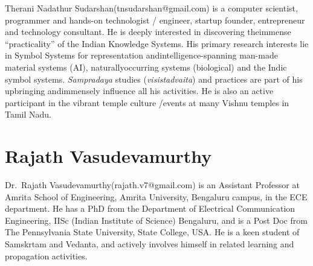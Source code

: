 Therani Nadathur Sudarshan(tnsudarshan@gmail.com) is a computer scientist, programmer and hands-on technologist / engineer, startup founder, entrepreneur and technology consultant. He is deeply interested in discovering the\break immense “practicality” of the Indian Knowledge Systems. His primary research interests lie in Symbol Systems for representation and\break intelligence-spanning man-made material systems (AI), naturally\break occurring systems (biological) and the Indic symbol systems. {\sl Sampradaya} studies ({\sl visistadvaita}) and practices are part of his upbringing and\break immensely influence all his activities. He is also an active participant in the vibrant temple culture /events at many Vishnu temples in Tamil Nadu.

\section*{Rajath Vasudevamurthy}

Dr.~Rajath Vasudevamurthy(rajath.v7@gmail.com) is an Assistant Professor at Amrita School of Engineering, Amrita University, Bengaluru campus, in the ECE department. He has a PhD from the Department of Electrical Communication Engineering, IISc (Indian Institute of Science) Bengaluru, and is a Post Doc from The Pennsylvania State University, State College, USA. He is a keen student of Samskrtam and Vedanta, and actively involves himself in related learning and propagation activities.

